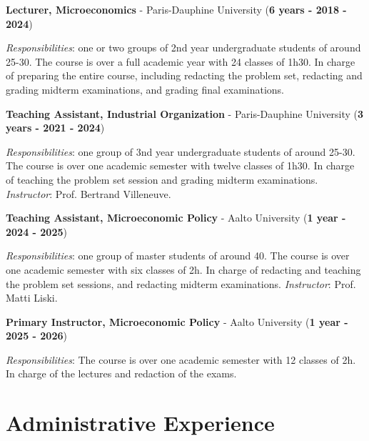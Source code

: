 \documentclass[letterpaper]{article}
\renewenvironment{itemize}{
  \begin{list}{}{
    \setlength{\leftmargin}{1.5em}
  }
}{
  \end{list}
}
\begin{document}
\begin{itemize}

\item \textbf{Lecturer, Microeconomics} - Paris-Dauphine University (\textbf{6 years - 2018 - 2024})

\textit{Responsibilities}: one or two groups of 2nd year undergraduate students of around 25-30. The course is over a full academic year with 24 classes of 1h30. In charge of preparing the entire course, including redacting the problem set, redacting and grading midterm examinations, and grading final examinations.

\item \textbf{Teaching Assistant, Industrial Organization} - Paris-Dauphine University (\textbf{3 years - 2021 - 2024})

\textit{Responsibilities}: one group of 3nd year undergraduate students of around 25-30. The course is over one academic semester with twelve classes of 1h30. In charge of teaching the problem set session and grading midterm examinations. \textit{Instructor}: Prof. Bertrand Villeneuve.  

\item \textbf{Teaching Assistant, Microeconomic Policy} - Aalto University (\textbf{1 year - 2024 - 2025})

\textit{Responsibilities}: one group of master students of around 40. The course is over one academic semester with six classes of 2h. In charge of redacting and teaching the problem set sessions, and redacting midterm examinations. \textit{Instructor}: Prof. Matti Liski.  

\item \textbf{Primary Instructor, Microeconomic Policy} - Aalto University (\textbf{1 year - 2025 - 2026})

\textit{Responsibilities}: The course is over one academic semester with 12 classes of 2h. In charge of the lectures and redaction of the exams.
\end{itemize}

\section*{\textbf{Administrative Experience}}
\end{document}
